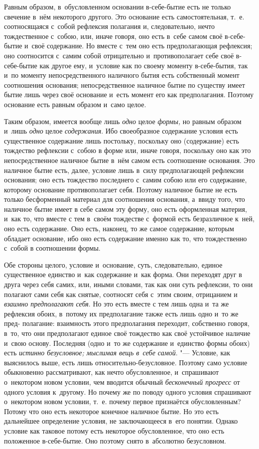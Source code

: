 Равным образом, в~обусловленном основании в-себе-бытие есть не только
свечение в~нём некоторого другого. Это основание есть самостоятельная,
т.~е. соотносящаяся с~собой рефлексия полагания и, следовательно, нечто
тождественное с~собою, или, иначе говоря, оно есть в~себе самом своё
в-себе-бытие и~своё содержание. Но вместе с~тем оно есть предполагающая
рефлексия; оно соотносится с~самим собой отрицательно и~противополагает
себе своё в-себе-бытие как другое ему, и~условие как по своему моменту
в-себе-бытия, так и~по моменту непосредственного наличного бытия есть
собственный момент соотношения основания; непосредственное наличное бытие
по существу имеет бытие лишь через своё основание и~есть момент его как
предполагания. Поэтому основание есть равным образом и~само целое.

Таким образом, имеется вообще лишь {\em одно} целое
{\em формы,} но равным образом и~лишь
{\em одно} целое {\em содержания}.
Ибо своеобразное содержание условия есть существенное содержание лишь
постольку, поскольку оно (содержание) есть тождество рефлексии с~собою в
форме или, иначе говоря, поскольку оно как это непосредственное наличное
бытие в~нём самом есть соотношение основания. Это наличное бытие есть,
далее, условие лишь в~силу предполагающей рефлексии основания; оно есть
тождество последнего с~самим собою или его содержание, которому основание
противополагает себя. Поэтому наличное бытие не есть только бесформенный
материал для соотношения основания, а~ввиду того, что наличное бытие имеет
в себе самом эту форму, оно есть оформленная материя, и~как то, что вместе
с тем в~своём тождестве с~формой есть безразличное к~ней, оно есть
содержание. Оно есть, наконец, то же самое содержание, которым обладает
основание, ибо оно есть содержание именно как то, что тождественно с~собой
в соотношении формы.

Обе стороны целого, условие и~основание, суть, следовательно, единое
существенное единство и~как содержание и~как форма. Они переходят друг в
друга через себя самих, или, иными словами, так как они суть рефлексии, то
они полагают сами себя как снятые, соотносят себя с~этим своим, отрицанием
и {\em взаимно предполагают себя}. Но это есть вместе с
тем лишь одна и~та же рефлексия обоих, в~потому их предполагание также есть
лишь одно и~то же пред- полагание: взаимность этого предполагания
переходит, собственно говоря, в~то, что они предполагают единое своё
тождество как своё устойчивое наличие и~свою основу. Последняя (одно и~то
же содержание и~единство формы обоих) есть {\em истинно
безусловное; мыслимая вещь в~себе самой}. "--- Условие, как выяснилось выше,
есть лишь относительно-безусловное. Поэтому само условие обыкновенно
рассматривают, как нечто обусловленное, и~спрашивают о~некотором новом
условии, чем вводится обычный {\em бесконечный
прогресс} от одного условия к~другому. Но почему же по поводу одного
условия спрашивают о~некотором новом условии, т.~е. почему первое
признаётся обусловленным? Потому что оно есть некоторое конечное наличное
бытие. Но это есть дальнейшее определение условия, не заключающееся в~его
понятии. Однако условие как таковое потому есть некоторое обусловленное,
что оно есть положенное в-себе-бытие. Оно поэтому снято в~абсолютно
безусловном.

